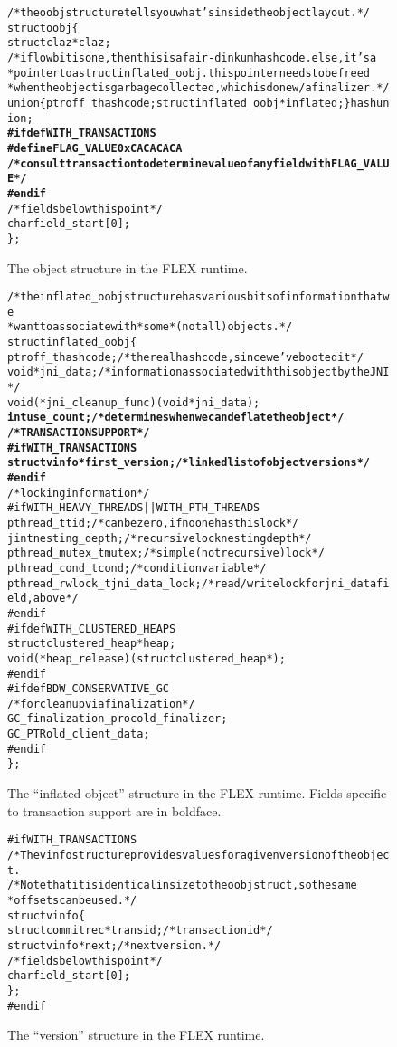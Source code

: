 \documentclass[11pt,notitlepage]{article}
\newcommand{\codesize}{\scriptsize}
\begin{document}
\begin{figure}
\begin{alltt}\codesize
/* the oobj structure tells you what's inside the object layout. */
struct oobj \{
  struct claz *claz;
  /* if low bit is one, then this is a fair-dinkum hashcode. else, it's a
   * pointer to a struct inflated_oobj. this pointer needs to be freed
   * when the object is garbage collected, which is done w/ a finalizer. */
  union \{ ptroff_t hashcode; struct inflated_oobj *inflated; \} hashunion;
\textbf{#ifdef WITH_TRANSACTIONS
#define FLAG_VALUE 0xCACACACA
  /* consult transaction to determine value of any field with FLAG_VALUE */
#endif}
  /* fields below this point */
  char field_start[0];
\};
\end{alltt}
\caption{The object structure in the FLEX runtime.}
\label{fig:oobj}
\end{figure}
\begin{figure}
\begin{alltt}\codesize
/* the inflated_oobj structure has various bits of information that we
 * want to associate with *some* (not all) objects. */
struct inflated_oobj \{
  ptroff_t hashcode; /* the real hashcode, since we've booted it */
  void *jni_data; /* information associated with this object by the JNI */
  void (*jni_cleanup_func)(void *jni_data);
\textbf{  int use_count; /* determines when we can deflate the object */
  /* TRANSACTION SUPPORT */
#if WITH_TRANSACTIONS
  struct vinfo *first_version; /* linked list of object versions */
#endif}
  /* locking information */
#if WITH_HEAVY_THREADS || WITH_PTH_THREADS
  pthread_t tid; /* can be zero, if no one has this lock */
  jint nesting_depth; /* recursive lock nesting depth */
  pthread_mutex_t mutex; /* simple (not recursive) lock */
  pthread_cond_t  cond; /* condition variable */
  pthread_rwlock_t jni_data_lock; /*read/write lock for jni_data field, above*/
#endif
#ifdef WITH_CLUSTERED_HEAPS
  struct clustered_heap * heap;
  void (*heap_release)(struct clustered_heap *);
#endif
#ifdef BDW_CONSERVATIVE_GC
  /* for cleanup via finalization */
  GC_finalization_proc old_finalizer;
  GC_PTR old_client_data;
#endif
\};
\end{alltt}
\caption{The ``inflated object'' structure in the FLEX runtime.
         Fields specific to transaction support are in boldface.}
\label{fig:infl}
\end{figure}

\begin{figure}
\begin{alltt}\codesize
#if WITH_TRANSACTIONS
/* The vinfo structure provides values for a given version of the object.
/* Note that it is identical in size to the oobj struct, so the same 
 * offsets can be used. */
struct vinfo \{
  struct commitrec *transid; /* transaction id */ 
  struct vinfo *next; /* next version. */
  /* fields below this point */
  char field_start[0];
\};
#endif
\end{alltt}
\caption{The ``version'' structure in the FLEX runtime.}
\label{fig:version}
\end{figure}
\end{document}
